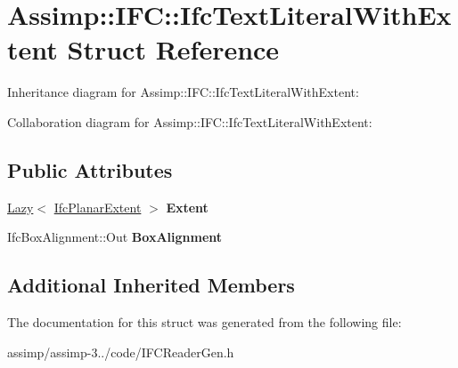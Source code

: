 \hypertarget{struct_assimp_1_1_i_f_c_1_1_ifc_text_literal_with_extent}{\section{Assimp\+:\+:I\+F\+C\+:\+:Ifc\+Text\+Literal\+With\+Extent Struct Reference}
\label{struct_assimp_1_1_i_f_c_1_1_ifc_text_literal_with_extent}
}


Inheritance diagram for Assimp\+:\+:I\+F\+C\+:\+:Ifc\+Text\+Literal\+With\+Extent\+:


Collaboration diagram for Assimp\+:\+:I\+F\+C\+:\+:Ifc\+Text\+Literal\+With\+Extent\+:
\subsection*{Public Attributes}
\begin{DoxyCompactItemize}
\item 
\hypertarget{struct_assimp_1_1_i_f_c_1_1_ifc_text_literal_with_extent_a0be9f1c0646d30ef4f66da2ef61251ac}{\hyperlink{struct_assimp_1_1_s_t_e_p_1_1_lazy}{Lazy}$<$ \hyperlink{struct_assimp_1_1_i_f_c_1_1_ifc_planar_extent}{Ifc\+Planar\+Extent} $>$ {\bfseries Extent}}\label{struct_assimp_1_1_i_f_c_1_1_ifc_text_literal_with_extent_a0be9f1c0646d30ef4f66da2ef61251ac}

\item 
\hypertarget{struct_assimp_1_1_i_f_c_1_1_ifc_text_literal_with_extent_a4a162f906fed1acb6fad29d2fa85f13e}{Ifc\+Box\+Alignment\+::\+Out {\bfseries Box\+Alignment}}\label{struct_assimp_1_1_i_f_c_1_1_ifc_text_literal_with_extent_a4a162f906fed1acb6fad29d2fa85f13e}

\end{DoxyCompactItemize}
\subsection*{Additional Inherited Members}


The documentation for this struct was generated from the following file\+:\begin{DoxyCompactItemize}
\item 
assimp/assimp-\/3../code/I\+F\+C\+Reader\+Gen.\+h\end{DoxyCompactItemize}
